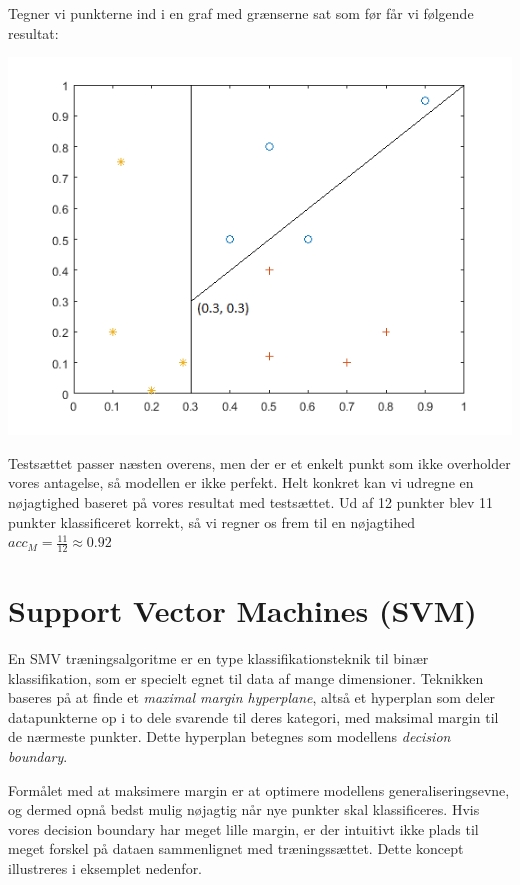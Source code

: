 \documentclass{article}
\begin{document}
Tegner vi punkterne ind i en graf med grænserne sat som før får vi følgende resultat:
\begin{center}
	\includegraphics{decision_tree_example_plot_test}
\end{center}
Testsættet passer næsten overens, men der er et enkelt punkt som ikke overholder vores antagelse, så modellen er ikke perfekt. Helt konkret kan vi udregne en nøjagtighed baseret på vores resultat med testsættet. Ud af 12 punkter blev 11 punkter klassificeret korrekt, så vi regner os frem til en nøjagtihed $acc_M=\frac{11}{12}\approx0.92$


\section{Support Vector Machines (SVM)}

En SMV træningsalgoritme er en type klassifikationsteknik til binær klassifikation, som er specielt egnet til data af mange dimensioner. Teknikken baseres på at finde et \textit{maximal margin hyperplane}, altså et hyperplan som deler datapunkterne op i to dele svarende til deres kategori, med maksimal margin til de nærmeste punkter. Dette hyperplan betegnes som modellens \textit{decision boundary}.

Formålet med at maksimere margin er at optimere modellens generaliseringsevne, og dermed opnå bedst mulig nøjagtig når nye punkter skal klassificeres. Hvis vores decision boundary har meget lille margin, er der intuitivt ikke plads til meget forskel på dataen sammenlignet med træningssættet. Dette koncept illustreres i eksemplet nedenfor.
\end{document}
